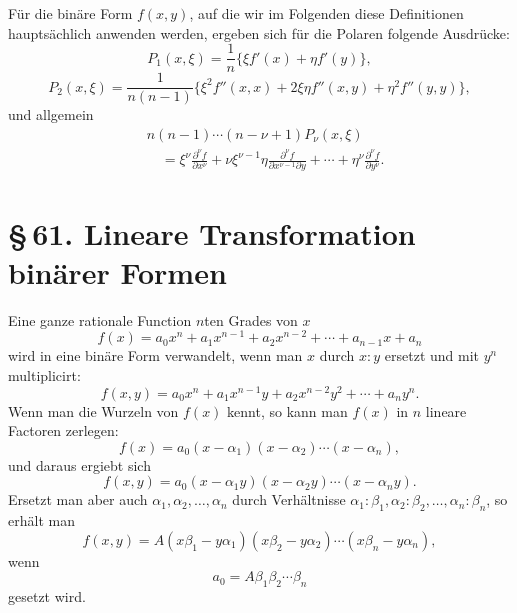 \documentclass[11pt]{article}
\providecommand{\sect}[2]{\section*{\S\,#1. #2}}
\begin{document}
Für die binäre Form $f(x,y)$, auf die wir im Folgenden diese Definitionen hauptsächlich anwenden werden, ergeben sich für die Polaren folgende Ausdrücke:
\[
 P_1(x,\xi)=\frac1n\{\xi f'(x)+\eta f'(y)\},
\]
\[
 P_2(x,\xi)=\frac1{n(n-1)}\{\xi^2f''(x,x)+2\xi\eta f''(x,y)+\eta^2f''(y,y)\},
\]
und allgemein
\[
\begin{aligned}
&n(n-1)\cdots(n-\nu+1)P_\nu(x,\xi)\\
&\quad=\xi^\nu\frac{\partial^\nu f}{\partial x^\nu}
+\nu\xi^{\nu-1}\eta\frac{\partial^\nu f}{\partial x^{\nu-1}\partial y}
+\cdots+
\eta^\nu\frac{\partial^\nu f}{\partial y^\nu}.
\end{aligned}
\]

\sect{61}{Lineare Transformation binärer Formen}

Eine ganze rationale Function $n$ten Grades von $x$
\begin{equation}
 f(x)=a_0x^n+a_1x^{n-1}+a_2x^{n-2}+\cdots+a_{n-1}x+a_n
\tag{1}
\end{equation}
wird in eine binäre Form verwandelt, wenn man $x$ durch $x:y$ ersetzt und mit $y^n$ multiplicirt:
\begin{equation}
 f(x,y)=a_0x^n+a_1x^{n-1}y+a_2x^{n-2}y^2+\cdots+a_ny^n.
\tag{2}
\end{equation}
Wenn man die Wurzeln von $f(x)$ kennt, so kann man $f(x)$ in $n$ lineare Factoren zerlegen:
\begin{equation}
 f(x)=a_0(x-\alpha_1)(x-\alpha_2)\cdots(x-\alpha_n),
\tag{3}
\end{equation}
und daraus ergiebt sich
\begin{equation}
 f(x,y)=a_0(x-\alpha_1y)(x-\alpha_2y)\cdots(x-\alpha_ny).
\tag{4}
\end{equation}
Ersetzt man aber auch $\alpha_1,\alpha_2,\ldots,\alpha_n$ durch Verhältnisse $\alpha_1:\beta_1,\alpha_2:\beta_2,\ldots,\alpha_n:\beta_n$, so erhält man
\begin{equation}
 f(x,y)=A(x\beta_1-y\alpha_1)(x\beta_2-y\alpha_2)\cdots(x\beta_n-y\alpha_n),
\tag{5}
\end{equation}
wenn
\[
 a_0=A\beta_1\beta_2\cdots\beta_n
\]
gesetzt wird.
\end{document}
